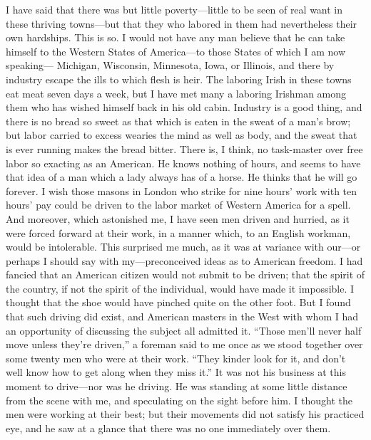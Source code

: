 I have said that there was but little poverty---little to be seen of
real want in these thriving towns---but that they who labored in
them had nevertheless their own hardships.  This is so.  I would
not have any man believe that he can take himself to the Western
States of America---to those States of which I am now speaking---%
Michigan, Wisconsin, Minnesota, Iowa, or Illinois, and there by
industry escape the ills to which flesh is heir.  The laboring
Irish in these towns eat meat seven days a week, but I have met
many a laboring Irishman among them who has wished himself back in
his old cabin.  Industry is a good thing, and there is no bread so
sweet as that which is eaten in the sweat of a man's brow; but
labor carried to excess wearies the mind as well as body, and the
sweat that is ever running makes the bread bitter.  There is, I
think, no task-master over free labor so exacting as an American.
He knows nothing of hours, and seems to have that idea of a man
which a lady always has of a horse.  He thinks that he will go
forever.  I wish those masons in London who strike for nine hours'
work with ten hours' pay could be driven to the labor market of
Western America for a spell.  And moreover, which astonished me, I
have seen men driven and hurried, as it were forced forward at
their work, in a manner which, to an English workman, would be
intolerable.  This surprised me much, as it was at variance with
our---or perhaps I should say with my---preconceived ideas as to
American freedom.  I had fancied that an American citizen would not
submit to be driven; that the spirit of the country, if not the
spirit of the individual, would have made it impossible.  I thought
that the shoe would have pinched quite on the other foot.  But I
found that such driving did exist, and American masters in the West
with whom I had an opportunity of discussing the subject all
admitted it.  ``Those men'll never half move unless they're driven,''
a foreman said to me once as we stood together over some twenty men
who were at their work.  ``They kinder look for it, and don't well
know how to get along when they miss it.''  It was not his business
at this moment to drive---nor was he driving.  He was standing at
some little distance from the scene with me, and speculating on the
sight before him.  I thought the men were working at their best;
but their movements did not satisfy his practiced eye, and he saw
at a glance that there was no one immediately over them.

